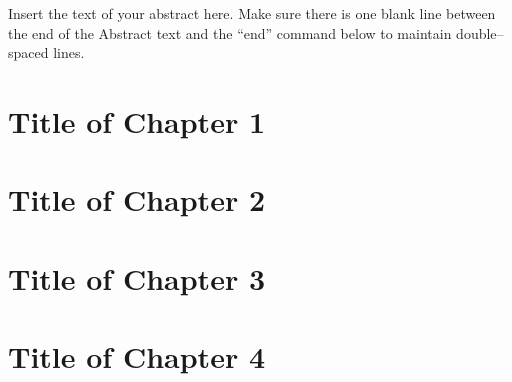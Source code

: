 \documentclass[12pt,letterpaper]{lsuetd}
\begin{document}
\renewenvironment{abstract}{{\hspace{-2.2em} \huge \textbf{\abstractname}} \par}{\pagebreak}
\begin{abstract}
\vspace{0.55ex}
\doublespacing
Insert the text of your abstract here.  Make sure there is one blank line between the end of the Abstract text and the ``end'' command below to maintain double--spaced lines.

\end{abstract}

\singlespacing
\setlength{\textfloatsep}{12pt plus 2pt minus 2pt}
\setlength{\intextsep}{6pt plus 2pt minus 2pt}
\chapter{Title of Chapter 1}
\doublespacing

\pagebreak
\singlespacing
\chapter{Title of Chapter 2}
\doublespacing

\pagebreak
\singlespacing
\chapter{Title of Chapter 3}
\doublespacing

\pagebreak
\singlespacing
\chapter{Title of Chapter 4}
\doublespacing

\pagebreak
\singlespacing
\end{document}

